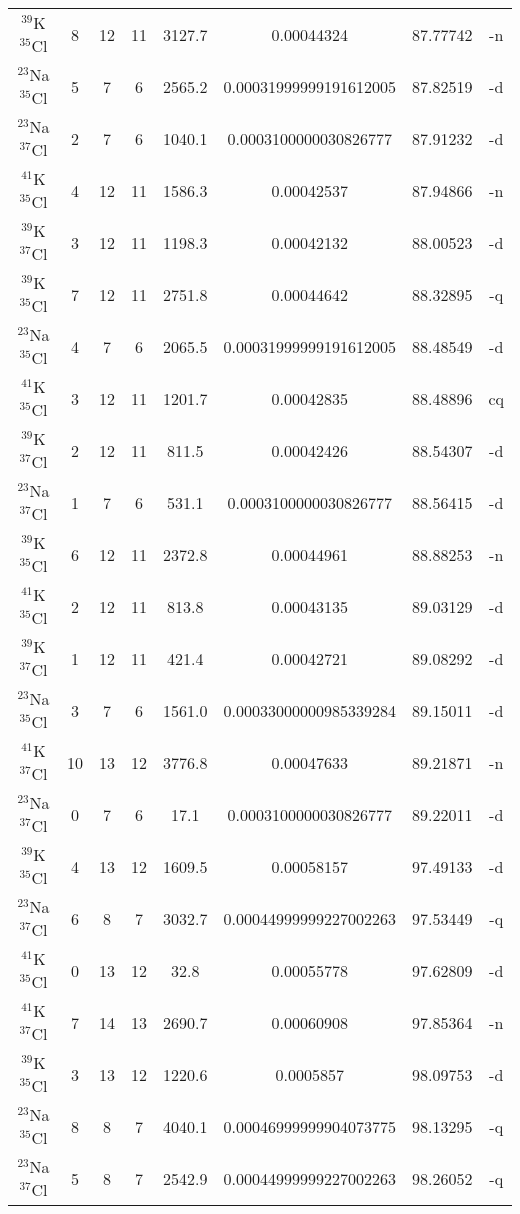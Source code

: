 \begin{table*}[htp]
\begin{tabular}{cccccccc}
$^{39}$K$^{35}$Cl & 8 & 12 & 11 & 3127.7 & 0.00044324 & 87.77742 & -n \\
$^{23}$Na$^{35}$Cl & 5 & 7 & 6 & 2565.2 & 0.00031999999191612005 & 87.82519 & -d \\
$^{23}$Na$^{37}$Cl & 2 & 7 & 6 & 1040.1 & 0.0003100000030826777 & 87.91232 & -d \\
$^{41}$K$^{35}$Cl & 4 & 12 & 11 & 1586.3 & 0.00042537 & 87.94866 & -n \\
$^{39}$K$^{37}$Cl & 3 & 12 & 11 & 1198.3 & 0.00042132 & 88.00523 & -d \\
$^{39}$K$^{35}$Cl & 7 & 12 & 11 & 2751.8 & 0.00044642 & 88.32895 & -q \\
$^{23}$Na$^{35}$Cl & 4 & 7 & 6 & 2065.5 & 0.00031999999191612005 & 88.48549 & -d \\
$^{41}$K$^{35}$Cl & 3 & 12 & 11 & 1201.7 & 0.00042835 & 88.48896 & cq \\
$^{39}$K$^{37}$Cl & 2 & 12 & 11 & 811.5 & 0.00042426 & 88.54307 & -d \\
$^{23}$Na$^{37}$Cl & 1 & 7 & 6 & 531.1 & 0.0003100000030826777 & 88.56415 & -d \\
$^{39}$K$^{35}$Cl & 6 & 12 & 11 & 2372.8 & 0.00044961 & 88.88253 & -n \\
$^{41}$K$^{35}$Cl & 2 & 12 & 11 & 813.8 & 0.00043135 & 89.03129 & -d \\
$^{39}$K$^{37}$Cl & 1 & 12 & 11 & 421.4 & 0.00042721 & 89.08292 & -d \\
$^{23}$Na$^{35}$Cl & 3 & 7 & 6 & 1561.0 & 0.00033000000985339284 & 89.15011 & -d \\
$^{41}$K$^{37}$Cl & 10 & 13 & 12 & 3776.8 & 0.00047633 & 89.21871 & -n \\
$^{23}$Na$^{37}$Cl & 0 & 7 & 6 & 17.1 & 0.0003100000030826777 & 89.22011 & -d \\
$^{39}$K$^{35}$Cl & 4 & 13 & 12 & 1609.5 & 0.00058157 & 97.49133 & -d \\
$^{23}$Na$^{37}$Cl & 6 & 8 & 7 & 3032.7 & 0.00044999999227002263 & 97.53449 & -q \\
$^{41}$K$^{35}$Cl & 0 & 13 & 12 & 32.8 & 0.00055778 & 97.62809 & -d \\
$^{41}$K$^{37}$Cl & 7 & 14 & 13 & 2690.7 & 0.00060908 & 97.85364 & -n \\
$^{39}$K$^{35}$Cl & 3 & 13 & 12 & 1220.6 & 0.0005857 & 98.09753 & -d \\
$^{23}$Na$^{35}$Cl & 8 & 8 & 7 & 4040.1 & 0.00046999999904073775 & 98.13295 & -q \\
$^{23}$Na$^{37}$Cl & 5 & 8 & 7 & 2542.9 & 0.00044999999227002263 & 98.26052 & -q \\

\end{tabular}
\end{table*}
